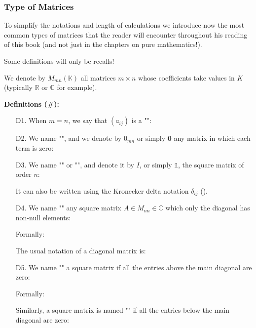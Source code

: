 	
	\subsubsection{Type of Matrices}
	To simplify the notations and length of calculations we introduce now the most common types of matrices that the reader will encounter throughout his reading of this book (and not just in the chapters on pure mathematics!).
	
	Some definitions will only be recalls!
	
	We denote by $M_{mn}(\mathbb{K})$ all matrices $m\times n$ whose coefficients take values in $K$ (typically $\mathbb{R}$ or $\mathbb{C}$ for example).
	
	\textbf{Definitions (\#\mydef):}
	\begin{enumerate}
		\item[D1.] When $m=n$, we say that $(a_{ij})$ is a "":
			

		\item[D2.] We name "", and we denote by $0_{mn}$ or simply $\mathbf{0}$ any matrix in which each term is zero:
			
	
		\item[D3.] We name "" or "", and denote it by $I$, or simply $\mathds{1}$, the square matrix of order $n$:
		
	
		It can also be written using the Kronecker delta notation $\delta_{ij}$ ().
		
		\item[D4.] We name "" any square matrix $A\in M_{nn}\in\mathbb{C}$ which only the diagonal has non-null elements:
		
		Formally:
		
		The usual notation of a diagonal matrix is:
		
		
		\item[D5.] We name "" a square matrix if all the entries above the main diagonal are zero:
		
		Formally:
		 
		 Similarly, a square matrix is named "" if all the entries below the main diagonal are zero:
		 

\end{enumerate}
